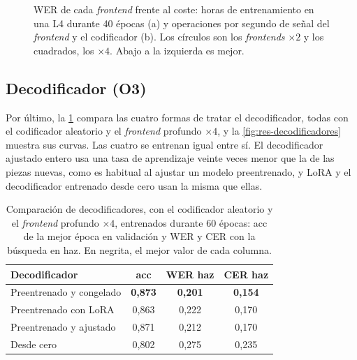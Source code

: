 \begin{figure}[htbp]
  \centering
  \caption[WER de cada frontend frente al coste]{WER de cada \textit{frontend} frente al coste: horas de entrenamiento en una L4 durante 40 épocas (a) y operaciones por segundo de señal del \textit{frontend} y el codificador (b). Los círculos son los \textit{frontends} $\times 2$ y los cuadrados, los $\times 4$. Abajo a la izquierda es mejor.}
  \label{fig:res-frontends-coste}
\end{figure}

\subsection{Decodificador (O3)}
\label{sec:res-decodificador}

Por último, la \cref{tab:res-decodificador} compara las cuatro formas de tratar el decodificador, todas con el codificador aleatorio y el \textit{frontend} profundo $\times 4$, y la \cref{fig:res-decodificadores} muestra sus curvas. Las cuatro se entrenan igual entre sí. El decodificador ajustado entero usa una tasa de aprendizaje veinte veces menor que la de las piezas nuevas, como es habitual al ajustar un modelo preentrenado, y LoRA y el decodificador entrenado desde cero usan la misma que ellas.

\begin{table}[htbp]
  \centering
  \caption[Comparación de los decodificadores]{Comparación de decodificadores, con el codificador aleatorio y el \textit{frontend} profundo $\times 4$, entrenados durante 60 épocas: acc de la mejor época en validación y WER y CER con la búsqueda en haz. En negrita, el mejor valor de cada columna.}
  \label{tab:res-decodificador}
  \small
  \begin{tabular}{lccc}
    \toprule
    \textbf{Decodificador} & \textbf{acc} & \textbf{WER haz} & \textbf{CER haz} \\
    \midrule
    Preentrenado y congelado & \textbf{0,873} & \textbf{0,201} & \textbf{0,154} \\
    Preentrenado con LoRA    & 0,863          & 0,222          & 0,170 \\
    Preentrenado y ajustado  & 0,871          & 0,212          & 0,170 \\
    \midrule
    Desde cero               & 0,802          & 0,275          & 0,235 \\
    \bottomrule
  \end{tabular}
\end{table}

